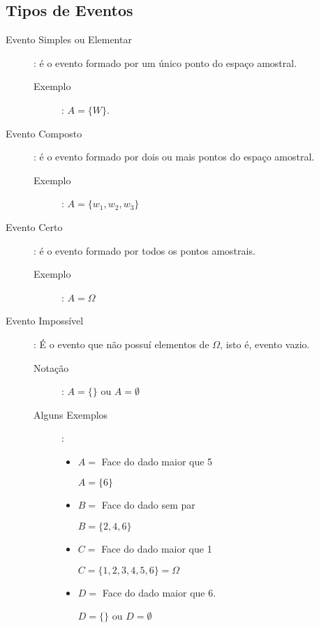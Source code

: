 \documentclass[11pt,a4paper]{book}
\begin{document}
\subsection{Tipos de Eventos}

\begin{description}
  \item [Evento Simples ou Elementar]: é o evento formado por um único ponto do espaço amostral. 
    \begin{description}
      \item [Exemplo]:
        $A=\{W\}$.
    \end{description}

  \item [Evento Composto]:  é o evento formado por dois ou mais pontos do espaço amostral.

    \begin{description}
      \item[Exemplo]:
        $ A= \{w_1,w_2,w_3 \}$
    \end{description}

  \item [Evento Certo]: é o evento formado por todos os pontos amostrais.
    \begin{description}
      \item    [Exemplo]: $A= \Omega$ 
    \end{description}
  \item [Evento Impossível]: É o evento que não possuí elementos de $\Omega$, isto é, evento vazio.
    \begin{description}
      \item [Notação]: $A=\{\}$ ou $A= \emptyset$

      \item    [Alguns Exemplos]:
        \begin{itemize}[label=]
          \item  $A=$ Face do dado maior que 5

            $A=\{6\}$

          \item    $B=$ Face do dado sem par 

            $B= \{2,4,6\}$

          \item    $C=$ Face do dado maior que 1

            $C= \{1,2,3,4,5,6\}=\Omega$

          \item        $D=$ Face do dado maior que 6.

           
            $D=\{ \}$ ou $D=\emptyset$
        \end{itemize}


    \end{description}
\end{description}
\end{document}
